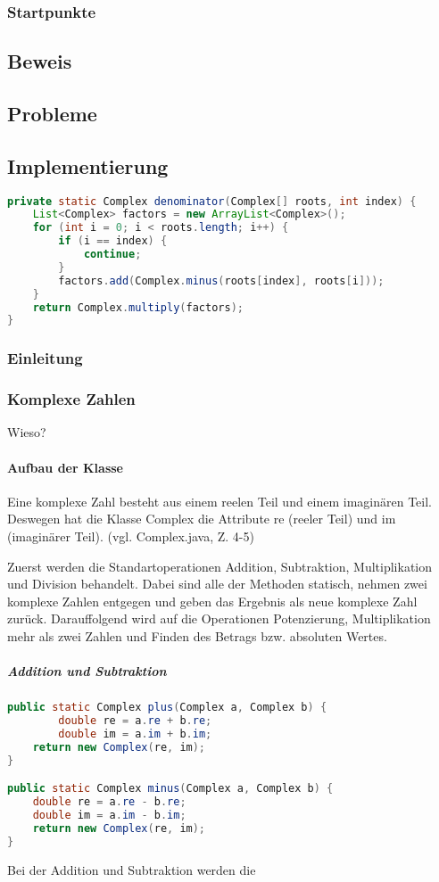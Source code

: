 \documentclass[12pt]{article}
\begin{document}
    \subsubsection{Startpunkte}
    \subsection{Beweis}
    \subsection{Probleme}
    \subsection{Implementierung}
    \begin{lstlisting}[language=Java]
private static Complex denominator(Complex[] roots, int index) {
    List<Complex> factors = new ArrayList<Complex>();
    for (int i = 0; i < roots.length; i++) {
        if (i == index) {
            continue;
        }
        factors.add(Complex.minus(roots[index], roots[i]));
    }
    return Complex.multiply(factors);
}
    \end{lstlisting}
    \subsubsection{Einleitung}
    \subsubsection{Komplexe Zahlen}
    Wieso?

    \paragraph{Aufbau der Klasse}
    Eine komplexe Zahl besteht aus einem reelen Teil und einem imaginären Teil. Deswegen hat die Klasse Complex die Attribute re (reeler Teil) und im (imaginärer Teil). 
    (vgl. Complex.java, Z. 4-5)

    Zuerst werden die Standartoperationen Addition, Subtraktion, Multiplikation und Division behandelt. Dabei sind alle der Methoden statisch, nehmen zwei komplexe Zahlen entgegen und geben das Ergebnis als neue komplexe Zahl zurück. Darauffolgend wird auf die Operationen Potenzierung, Multiplikation mehr als zwei Zahlen und Finden des Betrags bzw. absoluten Wertes. 

    \subparagraph{Addition und Subtraktion}
    \begin{lstlisting}[language=Java, title={Complex.java: Z. 19-29}]
public static Complex plus(Complex a, Complex b) {
        double re = a.re + b.re;
        double im = a.im + b.im;
    return new Complex(re, im);
}

public static Complex minus(Complex a, Complex b) {
    double re = a.re - b.re;
    double im = a.im - b.im;
    return new Complex(re, im);
}
    \end{lstlisting}
    Bei der Addition und Subtraktion werden die 
\end{document}
